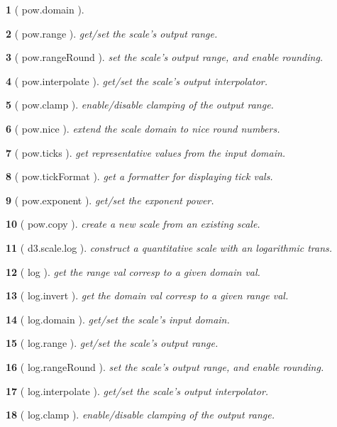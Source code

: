 \documentclass[10pt,landscape,letterpaper]{article}
\newcounter{thm}
\theoremstyle{mytheoremstyle}
\newtheorem*{thm}{}
\begin{document}
\begin{multicols}{3}
\begin{thm} [ pow.domain ]
\end{thm}\begin{thm} [ pow.range ]  get/set the scale's output range.
\end{thm}\begin{thm} [ pow.rangeRound ]  set the scale's output range, and enable rounding.
\end{thm}\begin{thm} [ pow.interpolate ]  get/set the scale's output interpolator.
\end{thm}\begin{thm} [ pow.clamp ]  enable/disable clamping of the output range.
\end{thm}\begin{thm} [ pow.nice ]  extend the scale domain to nice round numbers.
\end{thm}\begin{thm} [ pow.ticks ]  get representative values from the input domain.
\end{thm}\begin{thm} [ pow.tickFormat ]  get a formatter for displaying tick vals.
\end{thm}\begin{thm} [ pow.exponent ]  get/set the exponent power.
\end{thm}\begin{thm} [ pow.copy ]  create a new scale from an existing scale.
\end{thm}\begin{thm} [ d3.scale.log ]  construct a quantitative scale with an logarithmic trans.
\end{thm}\begin{thm} [ log ]  get the range val corresp to a given domain val.
\end{thm}\begin{thm} [ log.invert ]  get the domain val corresp to a given range val.
\end{thm}\begin{thm} [ log.domain ]  get/set the scale's input domain.
\end{thm}\begin{thm} [ log.range ]  get/set the scale's output range.
\end{thm}\begin{thm} [ log.rangeRound ]  set the scale's output range, and enable rounding.
\end{thm}\begin{thm} [ log.interpolate ]  get/set the scale's output interpolator.
\end{thm}\begin{thm} [ log.clamp ]  enable/disable clamping of the output range.

\end{thm}
\end{multicols}
\end{document}
